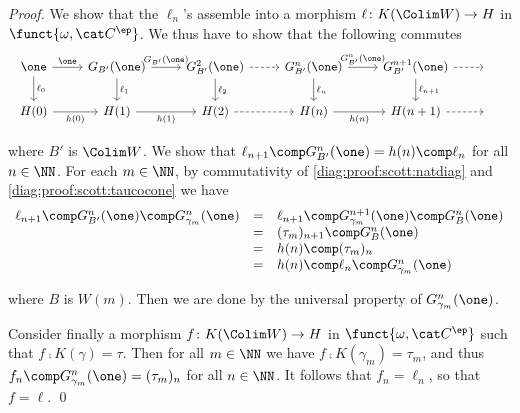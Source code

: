 \begin{proof}
We show that the $\ell_n$'s assemble into a morphism
$\ell \colon K(\Colim W) \to H$ in $\funct{\omega,\cat C^\ep}$.
We thus have to show that the following commutes
\begin{equation*}
\begin{array}{c}
\begin{tikzcd} %

  \one
  \arrow{r}[above]{\one}
  \arrow{d}{\ell_0}
& G_{B'}(\one)
   \arrow{r}[above]{G_{B'}(\one)}
   \arrow{d}{\ell_1}
 & G^2_{B'}(\one)
   \arrow{d}{\ell_2}
  \arrow[dashed]{r}
& G^n_{B'}(\one)
  \arrow{r}[above]{G_{B'}^n(\one)}
  \arrow{d}{\ell_n}
& G^{n+1}_{B'}(\one)
  \arrow{d}{\ell_{n+1}}
  \arrow[dashed]{r}
& \phantom{F}

\\

  H(0)
  \arrow{r}[below]{h(0)}
& H(1)
   \arrow{r}[below]{h(1)}
& H(2)
  \arrow[dashed]{r}
& H(n)
  \arrow{r}[below]{h(n)}
& H(n+1)
  \arrow[dashed]{r}
& \phantom{F}

\end{tikzcd}
\end{array}
\end{equation*}

\noindent
where $B'$ is $\Colim W$.
We show that $\ell_{n+1} \comp G_{B'}^n(\one) = h(n) \comp \ell_n$
for all $n \in \NN$.
For each $m \in \NN$, 
by commutativity of \eqref{diag:proof:scott:natdiag}
and \eqref{diag:proof:scott:taucocone}
we have
\[
\begin{array}{l l l}
  \ell_{n+1} \comp G_{B'}^{n}(\one) \comp G_{\gamma_m}^{n}(\one)
& =
& \ell_{n+1} \comp G_{\gamma_m}^{n+1}(\one) \comp G_B^{n}(\one)
\\

& =
& (\tau_m)_{n+1} \comp G_B^{n}(\one)
\\

& =
& h(n) \comp (\tau_m)_n
\\

& =
& h(n) \comp \ell_n \comp G_{\gamma_m}^n(\one)
\end{array}
\]

\noindent
where $B$ is $W(m)$.
Then we are done by the universal property of $G_{\gamma_m}^n(\one)$.

Consider finally a morphism $f \colon K(\Colim W) \to H$ in
$\funct{\omega,\cat C^\ep}$
such that $f \comp K(\gamma) = \tau$.
Then for all $m \in \NN$ we have
$f \comp K(\gamma_m) = \tau_m$,
and thus
$f_n \comp G_{\gamma_m}^n(\one) = (\tau_m)_n$
for all $n \in \NN$.
It follows that $f_n = \ell_n$, so that $f = \ell$.
\qed
\end{proof}


